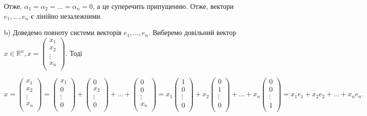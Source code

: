 \begin{example}
	Отже, $\alpha_1 = \alpha_2 = ... = \alpha_n = 0$, а це суперечить припущенню. Отже,
	вектори $e_1, ..., e_n$ є лінійно незалежними.
	
	b) Доведемо повноту системи векторів $e_1, ..., e_n$. Виберемо довільний вектор
	$x \in \mathbb{R}^n, x = \begin{pmatrix}
		x_1  \\
		x_2  \\
		\vdots  \\
		x_n  \\
	\end{pmatrix}$. Тоді
	
	$x = \begin{pmatrix}
		x_1  \\
		x_2  \\
		\vdots  \\
		x_n  \\
	\end{pmatrix} = \begin{pmatrix}
		x_1  \\
		0  \\
		\vdots  \\
		0  \\
	\end{pmatrix} + \begin{pmatrix}
		0  \\
		x_2  \\
		\vdots  \\
		0  \\
	\end{pmatrix} + ... + \begin{pmatrix}
		0  \\
		0  \\
		\vdots  \\
		x_n  \\
	\end{pmatrix} 
	=
	x_1 \begin{pmatrix}
		1  \\
		0  \\
		\vdots  \\
		0  \\
	\end{pmatrix} + x_2 \begin{pmatrix}
		0  \\
		1  \\
		\vdots  \\
		0  \\
	\end{pmatrix} + ... + x_n \begin{pmatrix}
		0  \\
		0  \\
		\vdots  \\
		1  \\
	\end{pmatrix}
	= x_1e_1 + x_2e_2 + ... + x_ne_n.$	


\end{example}
